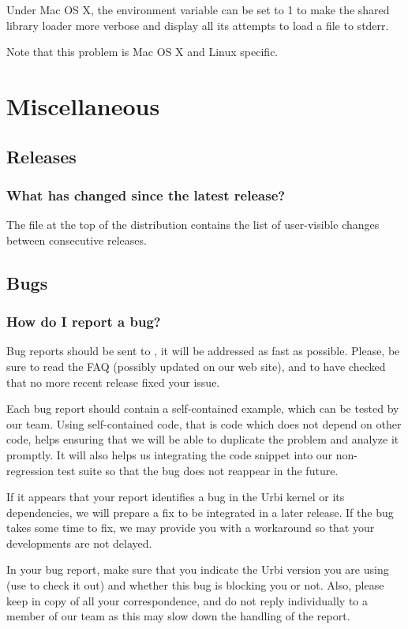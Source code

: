 Under Mac OS X, the  environment variable can
be set to 1 to make the shared library loader more verbose and display
all its attempts to load a file to stderr.

Note that this problem is Mac OS X and Linux specific.

\section{Miscellaneous}
\subsection{Releases}
\subsubsection{What has changed since the latest release?}
The file  at the top of the distribution
contains the list of user-visible changes between consecutive
releases.

\subsection{Bugs}
\subsubsection{How do I report a bug?}

Bug reports should be sent to , it
will be addressed as fast as possible.  Please, be sure to read the
FAQ (possibly updated on our web site), and to have checked that no
more recent release fixed your issue.

Each bug report should contain a self-contained example, which can be
tested by our team. Using self-contained code, that is code which does
not depend on other code, helps ensuring that we will be able to
duplicate the problem and analyze it promptly. It will also helps us
integrating the code snippet into our non-regression test suite so
that the bug does not reappear in the future.

If it appears that your report identifies a bug in the Urbi kernel or
its dependencies, we will prepare a fix to be integrated in a later
release. If the bug takes some time to fix, we may provide you with a
workaround so that your developments are not delayed.

In your bug report, make sure that you indicate the Urbi version you
are using (use  to check it out) and whether this
bug is blocking you or not. Also, please keep
 in copy of all your
correspondence, and do not reply individually to a member of our team
as this may slow down the handling of the report.



